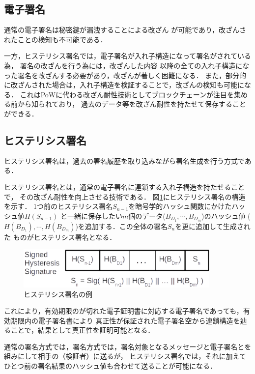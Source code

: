 \documentclass[a4paper,12pt]{jsarticle}
\begin{document}
\subsection{電子署名}
通常の電子署名は秘密鍵が漏洩することによる改ざん
が可能であり，改ざんされたことの検知も不可能である．

一方，ヒステリシス署名では，電子署名が入れ子構造になって署名がされている為，
署名の改ざんを行う為には，改ざんした内容
以降の全ての入れ子構造になった署名を改ざんする必要があり，改ざんが著しく困難になる．
また，部分的に改ざんされた場合は，入れ子構造を検証することで，改ざんの検知も可能になる．
これはPoWに代わる改ざん耐性技術としてブロックチェーンが注目を集める前から知られており，
過去のデータ等を改ざん耐性を持たせて保存することができる．

\subsection{ヒステリシス署名}

ヒステリシス署名は，過去の署名履歴を取り込みながら署名生成を行う方式である．

ヒステリシス署名\cite{suzaki}とは，通常の電子署名に連鎖する入れ子構造を持たせることで，
その改ざん耐性を向上させる技術である．
図\ref{fig:hysteresis}にヒステリシス署名の構造を示す．
1つ前のヒステリシス署名$S_{n-1}$を暗号学的ハッシュ関数にかけたハッシュ値$H(S_{n-1})$
と一緒に保存したい$m$個のデータ($B_{D_1}, \cdots, B_{D_m}$)のハッシュ値
($H(B_{D_1}), \cdots, H(B_{D_m})$)を追加する．この全体の署名$S_n$を更に追加して生成された
ものがヒステリシス署名となる．

\begin{figure}[H]%
  \begin{center}
    \includegraphics[width=100mm]{pht/hysteresis_signature.eps}
  \end{center}
  \caption{ヒステリシス署名の例}
  \label{fig:hysteresis}
\end{figure}


これにより，有効期限のが切れた電子証明書に対応する電子署名であっても，有効期限内の電子署名書により
真正性が保証された電子署名空から連鎖構造を辿ることで，結果として真正性を証明可能となる．

通常の署名方式では，署名方式では，署名対象となるメッセージと電子署名とを組みにして相手の（検証者）に送るが，
ヒステリシス署名では，それに加えてひとつ前の署名結果のハッシュ値も合わせて送ることが可能になる．
\end{document}
